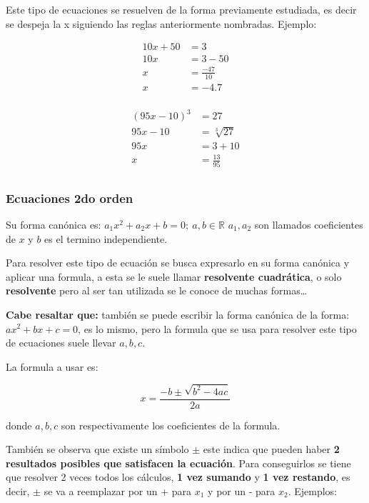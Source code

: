 \documentclass[12pt]{article}
\begin{document}
    Este tipo de ecuaciones se resuelven de la forma previamente estudiada, es
    decir se despeja la x siguiendo las reglas anteriormente nombradas. Ejemplo:

    \begin{align*}
        10x +50 &= 3		\\
        10x &= 3-50 \\
        x &= \frac{-47}{10} \\
        x &= -4.7\\
    \end{align*}

   \begin{align*}
       (95x -10)^3 &= 27		\\
       95x -10 &= \sqrt[3]{27} \\
       95x &= 3 +10\\
       x &= \frac{13}{95} \\
   \end{align*}



    \subsubsection*{Ecuaciones 2do orden} \label{Ecuaciones-2do-orden}
    Su forma canónica es: $a_1x^2+a_2x+b=0;\ a,b\in\mathbb{R}$ $a_1,a_2$ son
    llamados coeficientes  de $x$ y $b$ es el termino independiente.

    Para resolver este tipo de ecuación se busca expresarlo en su forma canónica
    y aplicar una formula, a esta se le suele llamar \textbf{resolvente cuadrática},
    o solo \textbf{resolvente} pero al ser tan utilizada se le conoce de muchas
    formas\dots

    \textbf{Cabe resaltar que:}
    también se puede escribir la forma canónica de la forma:
    $ax^2+bx+c=0$, es lo mismo, pero la formula que se usa para resolver este tipo
    de ecuaciones suele llevar $a,b,c$.

    La formula a usar es:

    $$x = \frac{-b \pm \sqrt{b^2 - 4ac}}{2a} $$


    donde $a,b,c$ son respectivamente los coeficientes de la formula.

    También se observa que existe un símbolo $\pm$ este indica que pueden haber
    \textbf{2 resultados posibles que satisfacen la ecuación}. Para conseguirlos
    se tiene que resolver 2 veces todos los cálculos, \textbf{1 vez sumando} y
    \textbf{1 vez restando}, es decir, $\pm$ se va a reemplazar por un + para
    $x_1$ y por un - para $x_2$.    Ejemplos:
\end{document}

